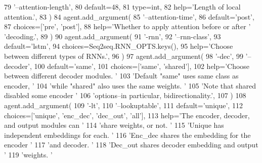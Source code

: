 \begin{DoxyCode}
79             \textcolor{stringliteral}{'--attention-length'},
80             default=48,
81             type=int,
82             help=\textcolor{stringliteral}{'Length of local attention.'},
83         )
84         agent.add\_argument(
85             \textcolor{stringliteral}{'--attention-time'},
86             default=\textcolor{stringliteral}{'post'},
87             choices=[\textcolor{stringliteral}{'pre'}, \textcolor{stringliteral}{'post'}],
88             help=\textcolor{stringliteral}{'Whether to apply attention before or after '} \textcolor{stringliteral}{'decoding.'},
89         )
90         agent.add\_argument(
91             \textcolor{stringliteral}{'-rnn'},
92             \textcolor{stringliteral}{'--rnn-class'},
93             default=\textcolor{stringliteral}{'lstm'},
94             choices=Seq2seq.RNN\_OPTS.keys(),
95             help=\textcolor{stringliteral}{'Choose between different types of RNNs.'},
96         )
97         agent.add\_argument(
98             \textcolor{stringliteral}{'-dec'},
99             \textcolor{stringliteral}{'--decoder'},
100             default=\textcolor{stringliteral}{'same'},
101             choices=[\textcolor{stringliteral}{'same'}, \textcolor{stringliteral}{'shared'}],
102             help=\textcolor{stringliteral}{'Choose between different decoder modules. '}
103             \textcolor{stringliteral}{'Default "same" uses same class as encoder, '}
104             \textcolor{stringliteral}{'while "shared" also uses the same weights. '}
105             \textcolor{stringliteral}{'Note that shared disabled some encoder '}
106             \textcolor{stringliteral}{'options--in particular, bidirectionality.'},
107         )
108         agent.add\_argument(
109             \textcolor{stringliteral}{'-lt'},
110             \textcolor{stringliteral}{'--lookuptable'},
111             default=\textcolor{stringliteral}{'unique'},
112             choices=[\textcolor{stringliteral}{'unique'}, \textcolor{stringliteral}{'enc\_dec'}, \textcolor{stringliteral}{'dec\_out'}, \textcolor{stringliteral}{'all'}],
113             help=\textcolor{stringliteral}{'The encoder, decoder, and output modules can '}
114             \textcolor{stringliteral}{'share weights, or not. '}
115             \textcolor{stringliteral}{'Unique has independent embeddings for each. '}
116             \textcolor{stringliteral}{'Enc\_dec shares the embedding for the encoder '}
117             \textcolor{stringliteral}{'and decoder. '}
118             \textcolor{stringliteral}{'Dec\_out shares decoder embedding and output '}
119             \textcolor{stringliteral}{'weights. '}

\end{DoxyCode}
